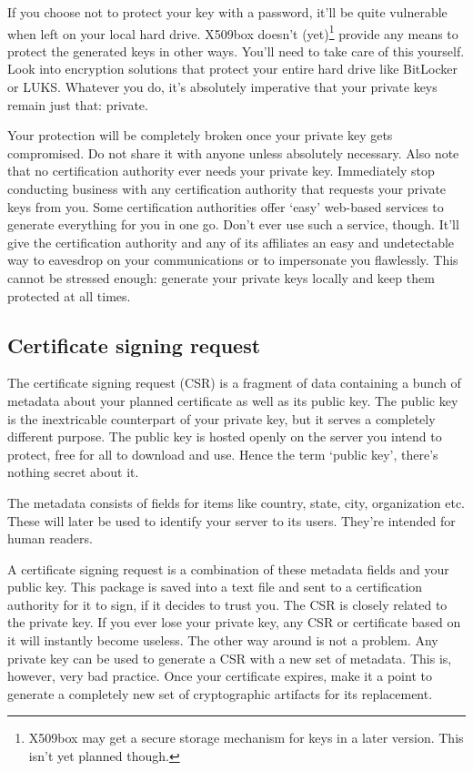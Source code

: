 \documentclass[a4paper,12pt]{article}
\begin{document}
If you choose not to protect your key with a password, it'll be quite vulnerable when left on your local hard drive. X509box doesn't (yet)\footnote{X509box may get a secure storage mechanism for keys in a later version. This isn't yet planned though.} provide any means to protect the generated keys in other ways. You'll need to take care of this yourself. Look into encryption solutions that protect your entire hard drive like BitLocker or LUKS. Whatever you do, it's absolutely imperative that your private keys remain just that: private. 

Your protection will be completely broken once your private key gets compromised. Do not share it with anyone unless absolutely necessary. Also note that no certification authority ever needs your private key. Immediately stop conducting business with any certification authority that requests your private keys from you. Some certification authorities offer `easy' web-based services to generate everything for you in one go. Don't ever use such a service, though. It'll give the certification authority and any of its affiliates an easy and undetectable way to eavesdrop on your communications or to impersonate you flawlessly. This cannot be stressed enough: generate your private keys locally and keep them protected at all times.

\subsection{Certificate signing request}
The certificate signing request (CSR) is a fragment of data containing a bunch of metadata about your planned certificate as well as its public key. The public key is the inextricable counterpart of your private key, but it serves a completely different purpose. The public key is hosted openly on the server you intend to protect, free for all to download and use. Hence the term `public key', there's nothing secret about it.

The metadata consists of fields for items like country, state, city, organization etc. These will later be used to identify your server to its users. They're intended for human readers.

A certificate signing request is a combination of these metadata fields and your public key. This package is saved into a text file and sent to a certification authority for it to sign, if it decides to trust you. The CSR is closely related to the private key. If you ever lose your private key, any CSR or certificate based on it will instantly become useless. The other way around is not a problem. Any private key can be used to generate a CSR with a new set of metadata. This is, however, very bad practice. Once your certificate expires, make it a point to generate a completely new set of cryptographic artifacts for its replacement.
\end{document}

